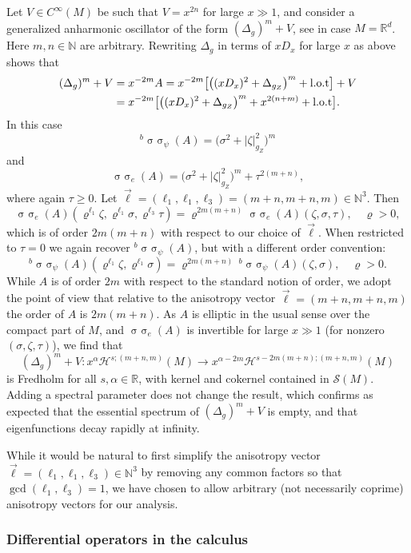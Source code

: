 \documentclass[reqno]{amsart}
\numberwithin{equation}{section}
\theoremstyle{definition}
\def\N{\mathbb N}
\def\R{\mathbb R}
\DeclareMathOperator{\sym}{ \sigma\!\!\!\sigma}
\begin{document}
Let $V \in C^{\infty}(M)$ be such that $V = x^{2n}$ for large $x \gg 1$, and consider a generalized anharmonic oscillator of the form $(\Delta_g)^m + V$, see \cite{ChatzakouDelgadoRuzhansky} in case $M = \R^d$. Here $m,n \in \N$ are arbitrary. Rewriting $\Delta_g$ in terms of $xD_x$ for large $x$ as above shows that
\begin{align*}
(\Delta_g)^m + V &= x^{-2m}A = x^{-2m}\bigl[\bigl((xD_x)^{2} + \Delta_{g_Z}\bigr)^m + \textup{l.o.t}\bigr] + V \\
&= x^{-2m}\bigl[\bigl((xD_x)^{2} + \Delta_{g_Z}\bigr)^m + x^{2(n+m)} + \textup{l.o.t}\bigr].
\end{align*}
In this case
$$
{}^b\sym_{\psi}(A) = \bigl(\sigma^{2} + |\zeta|_{g_Z}^2\bigr)^m
$$
and
$$
\sym_e(A) = \bigl(\sigma^{2} + |\zeta|_{g_Z}^{2}\bigr)^m + \tau^{2(m+n)},
$$
where again $\tau \geq 0$. Let $\vec{\ell} = (\ell_1,\ell_1,\ell_3) = (m+n,m+n,m) \in \N^3$. Then
$$
\sym_e(A)(\varrho^{\ell_1}\zeta,\varrho^{\ell_1}\sigma,\varrho^{\ell_3}\tau) = \varrho^{2m(m+n)}\sym_e(A)(\zeta,\sigma,\tau), \quad \varrho > 0,
$$
which is of order $2m(m+n)$ with respect to our choice of $\vec{\ell}$. When restricted to $\tau=0$ we again recover ${}^b\sym_{\psi}(A)$, but with a different order convention:
$$
{}^b\sym_{\psi}(A)(\varrho^{\ell_1}\zeta,\varrho^{\ell_1}\sigma) = \varrho^{2m(m+n)}\,{}^b\sym_{\psi}(A)(\zeta,\sigma), \quad \varrho > 0.
$$
While $A$ is of order $2m$ with respect to the standard notion of order, we adopt the point of view that relative to the anisotropy vector $\vec{\ell} =  (m+n,m+n,m)$ the order of $A$ is $2m(m+n)$. As $A$ is elliptic in the usual sense over the compact part of $M$, and $\sym_e(A)$ is invertible for large $x \gg 1$ (for nonzero $(\sigma,\zeta,\tau)$), we find that
$$
(\Delta_g)^m + V : x^{\alpha}{\mathscr H}^{s;(m+n,m)}(M) \to x^{\alpha-2m}{\mathscr H}^{s-2m(m+n);(m+n,m)}(M) 
$$
is Fredholm for all $s,\alpha \in \R$, with kernel and cokernel contained in ${\mathscr S}(M)$. Adding a spectral parameter does not change the result, which confirms as expected that the essential spectrum of $(\Delta_g)^m + V$ is empty, and that eigenfunctions decay rapidly at infinity.

While it would be natural to first simplify the anisotropy vector $\vec{\ell} = (\ell_1,\ell_1,\ell_3) \in \N^3$ by removing any common factors so that  $\gcd(\ell_1,\ell_3) = 1$, we have chosen to allow arbitrary (not necessarily coprime) anisotropy vectors for our analysis.

\subsubsection*{Differential operators in the calculus}
\end{document}

